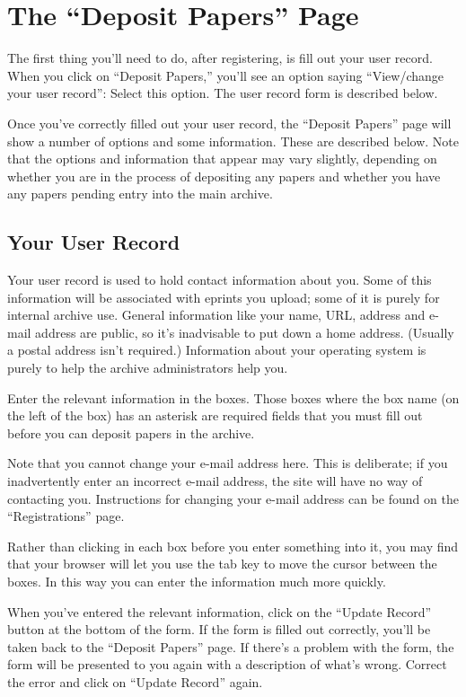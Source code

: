 \section{The ``Deposit Papers'' Page}


The first thing you'll need to do, after registering, is fill out your user record.  When you click on ``Deposit Papers,'' you'll see an option saying ``View/change your user record'': Select this option. The user record form is described below.

Once you've correctly filled out your user record, the ``Deposit Papers'' page will show a number of options and some information. These are described below. Note that the options and information that appear may vary slightly, depending on whether you are in the process of depositing any papers and whether you have any papers pending entry into the main archive.


\subsection{Your User Record}

Your user record is used to hold contact information about you. Some of this information will be associated with eprints you upload; some of it is purely for internal archive use. General information like your name, URL, address and e-mail address are public, so it's inadvisable to put down a home address. (Usually a postal address isn't required.) Information about your operating system is purely to help the archive administrators help you.

Enter the relevant information in the boxes. Those boxes where the box name (on the left of the box) has an asterisk are required fields that you must fill out before you can deposit papers in the archive.

Note that you cannot change your e-mail address here. This is deliberate; if you inadvertently enter an incorrect e-mail address, the site will have no way of contacting you. Instructions for changing your e-mail address can be found on the ``Registrations'' page.

Rather than clicking in each box before you enter something into it, you may find that your browser will let you use the tab key to move the cursor between the boxes. In this way you can enter the information much more quickly.

When you've entered the relevant information, click on the ``Update Record'' button at the bottom of the form. If the form is filled out correctly, you'll be taken back to the ``Deposit Papers'' page. If there's a problem with the form, the form will be presented to you again with a description of what's wrong. Correct the error and click on ``Update Record'' again.


